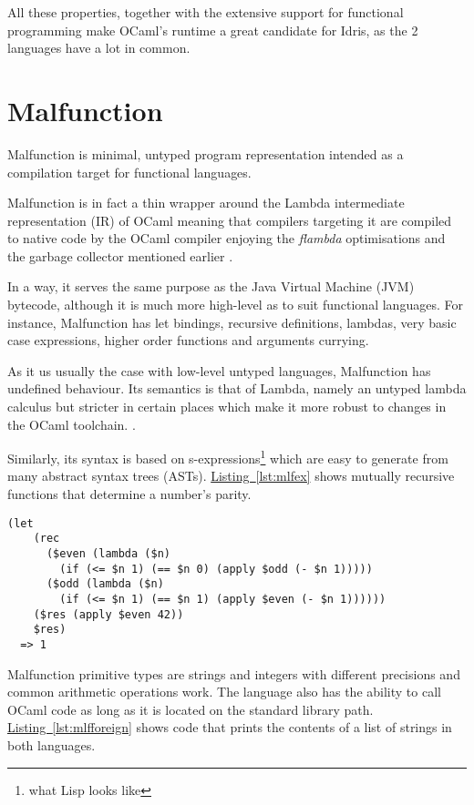 All these properties, together with the extensive support
for functional programming make OCaml's runtime a great
candidate for Idris, as the 2 languages have a lot in common.

\section{Malfunction}
Malfunction is minimal, untyped program representation intended as a
compilation target for functional languages.

Malfunction is in fact a thin wrapper around the Lambda intermediate
representation (IR) of OCaml meaning that compilers targeting it
are compiled to native code by the OCaml compiler enjoying the
\emph{flambda} optimisations and the garbage collector mentioned
earlier \citep{dolan2016malfunctional}.

In a way, it serves the same purpose as the Java Virtual Machine (JVM)
bytecode, although it is much more high-level as
to suit functional languages. For instance, Malfunction has
let bindings, recursive definitions, lambdas, very basic case
expressions, higher order functions and arguments currying.

As it us usually the case with low-level untyped languages, Malfunction
has undefined behaviour.
Its semantics is that of Lambda, namely an untyped lambda calculus but
stricter in certain places which make it more robust to changes in the
OCaml toolchain.
\citep{dolan2016malfunctional}.

Similarly, its syntax is based on s-expressions\footnote{
    what Lisp looks like
} which are easy to generate from many abstract syntax trees (ASTs).
\hyperref[lst:mlfex]{Listing~\ref{lst:mlfex}} shows mutually recursive
functions that determine a number's parity.

\begin{lstlisting}[label={lst:mlfex}, caption=
    Mutually recursive functions in Malfunction
    ]
    (let
    (rec
      ($even (lambda ($n) 
        (if (<= $n 1) (== $n 0) (apply $odd (- $n 1)))))
      ($odd (lambda ($n) 
        (if (<= $n 1) (== $n 1) (apply $even (- $n 1))))))
    ($res (apply $even 42))
    $res)
  => 1
\end{lstlisting}

Malfunction primitive types are strings and integers with
different precisions and common arithmetic operations
work. The language also has the ability to call OCaml code as long
as it is located on the standard library path.
\hyperref[lst:mlfforeign]{Listing~\ref{lst:mlfforeign}}
shows code that prints the contents of a list of strings in both
languages.

